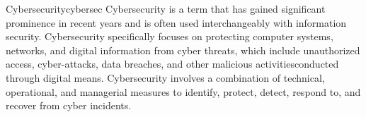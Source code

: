 \begin{center}
\begin{minipage}{\textwidth}
\renewcommand\thempfootnote{\textcolor{orange}{\arabic{footnote}}}
\setlength\parindent{15pt}
\begin{theo}{Cybersecurity}{cybersec}
Cybersecurity is a term that has gained significant prominence in recent years and is often used interchangeably with information security. Cybersecurity specifically focuses on protecting computer                   systems, networks, and digital information from cyber threats, which include unauthorized access, cyber-attacks, data breaches, and other malicious activitiesconducted through digital means. Cybersecurity involves a combination of technical, operational, and managerial measures to identify, protect, detect, respond to, and recover from cyber incidents.\cite{boyle2023}
\end{theo}
\end{minipage}
\end{center}
